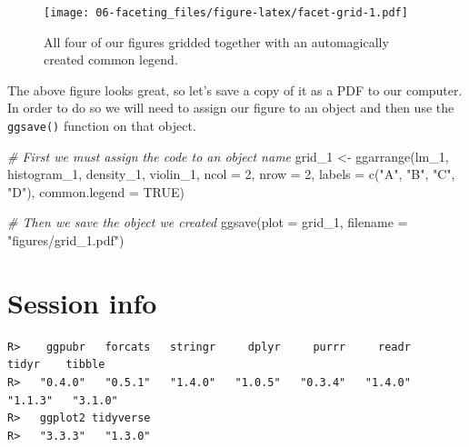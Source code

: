 \documentclass[
]{book}
\newenvironment{Shaded}{\begin{snugshade}}{\end{snugshade}}
\newcommand{\AttributeTok}[1]{\textcolor[rgb]{0.77,0.63,0.00}{#1}}
\newcommand{\CommentTok}[1]{\textcolor[rgb]{0.56,0.35,0.01}{\textit{#1}}}
\newcommand{\ConstantTok}[1]{\textcolor[rgb]{0.00,0.00,0.00}{#1}}
\newcommand{\DecValTok}[1]{\textcolor[rgb]{0.00,0.00,0.81}{#1}}
\newcommand{\FunctionTok}[1]{\textcolor[rgb]{0.00,0.00,0.00}{#1}}
\newcommand{\NormalTok}[1]{#1}
\newcommand{\OtherTok}[1]{\textcolor[rgb]{0.56,0.35,0.01}{#1}}
\newcommand{\SpecialCharTok}[1]{\textcolor[rgb]{0.00,0.00,0.00}{#1}}
\newcommand{\StringTok}[1]{\textcolor[rgb]{0.31,0.60,0.02}{#1}}
\begin{document}
\begin{figure}
\centering
\texttt{[image: 06-faceting\_files/figure-latex/facet-grid-1.pdf]}
\caption{\label{fig:facet-grid}All four of our figures gridded together with an automagically created common legend.}
\end{figure}

The above figure looks great, so let's save a copy of it as a PDF to our computer. In order to do so we will need to assign our figure to an object and then use the \texttt{ggsave()} function on that object.

\begin{Shaded}
\begin{Highlighting}[]
\CommentTok{\# First we must assign the code to an object name}
\NormalTok{grid\_1 }\OtherTok{\textless{}{-}} \FunctionTok{ggarrange}\NormalTok{(lm\_1, histogram\_1, density\_1, violin\_1, }
                    \AttributeTok{ncol =} \DecValTok{2}\NormalTok{, }\AttributeTok{nrow =} \DecValTok{2}\NormalTok{, }
                    \AttributeTok{labels =} \FunctionTok{c}\NormalTok{(}\StringTok{"A"}\NormalTok{, }\StringTok{"B"}\NormalTok{, }\StringTok{"C"}\NormalTok{, }\StringTok{"D"}\NormalTok{),}
                    \AttributeTok{common.legend =} \ConstantTok{TRUE}\NormalTok{)}

\CommentTok{\# Then we save the object we created}
\FunctionTok{ggsave}\NormalTok{(}\AttributeTok{plot =}\NormalTok{ grid\_1, }\AttributeTok{filename =} \StringTok{"figures/grid\_1.pdf"}\NormalTok{)}
\end{Highlighting}
\end{Shaded}

\hypertarget{session-info-4}{%
\section{Session info}\label{session-info-4}}

\begin{Shaded}
\end{Shaded}

\begin{verbatim}
R>    ggpubr   forcats   stringr     dplyr     purrr     readr     tidyr    tibble 
R>   "0.4.0"   "0.5.1"   "1.4.0"   "1.0.5"   "0.3.4"   "1.4.0"   "1.1.3"   "3.1.0" 
R>   ggplot2 tidyverse 
R>   "3.3.3"   "1.3.0"
\end{verbatim}
\end{document}
